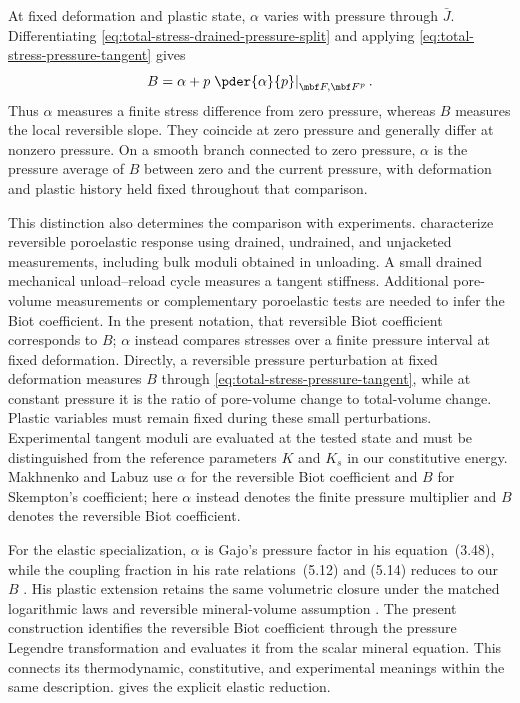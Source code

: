 At fixed deformation and plastic state, \(\alpha\) varies with pressure
through \(\bar J\).  Differentiating
\eqref{eq:total-stress-drained-pressure-split} and applying
\eqref{eq:total-stress-pressure-tangent} gives
\begin{equation*}
 B=\alpha+p\left.\pder{\alpha}{p}\right|_{\mbf F,\mbf F^p}.
\end{equation*}
Thus \(\alpha\) measures a finite stress difference from zero pressure,
whereas \(B\) measures the local reversible slope.  They coincide at zero
pressure and generally differ at nonzero pressure.  On a smooth branch
connected to zero pressure, \(\alpha\) is the pressure average of \(B\)
between zero and the current pressure, with deformation and plastic history
held fixed throughout that comparison.

This distinction also determines the comparison with experiments.
\citet[Secs.~2(a) and 4(a)]{makhnenkolabuz2016} characterize reversible
poroelastic response using drained, undrained, and unjacketed measurements,
including bulk moduli obtained in unloading.  A small drained mechanical
unload--reload cycle measures a tangent stiffness.  Additional pore-volume
measurements or complementary poroelastic tests are needed to infer the
Biot coefficient.  In the present notation, that reversible Biot coefficient
corresponds to \(B\); \(\alpha\) instead compares stresses over a finite
pressure interval at fixed deformation.  Directly, a reversible pressure
perturbation at fixed deformation measures \(B\) through
\eqref{eq:total-stress-pressure-tangent}, while at constant pressure it is
the ratio of pore-volume change to total-volume change.  Plastic variables
must remain fixed during these small perturbations.  Experimental tangent
moduli are evaluated at the tested state and must be distinguished from the
reference parameters \(K\) and \(K_s\) in our constitutive energy.
Makhnenko and Labuz use \(\alpha\) for the reversible Biot coefficient and
\(B\) for Skempton's coefficient; here \(\alpha\) instead denotes the finite
pressure multiplier and \(B\) denotes the reversible Biot coefficient.

For the elastic specialization, \(\alpha\) is Gajo's pressure factor
in his equation~(3.48), while the coupling fraction in his rate
relations~(5.12) and (5.14) reduces to our \(B\) \citep{gajo2010}.
His plastic extension retains the same volumetric closure under the
matched logarithmic laws and reversible mineral-volume assumption
\citep{gajo2011}.  The present construction identifies the reversible
Biot coefficient through the pressure Legendre transformation and evaluates it
from the scalar mineral equation.  This connects its thermodynamic,
constitutive, and experimental meanings within the same description.
 gives the explicit elastic reduction.


